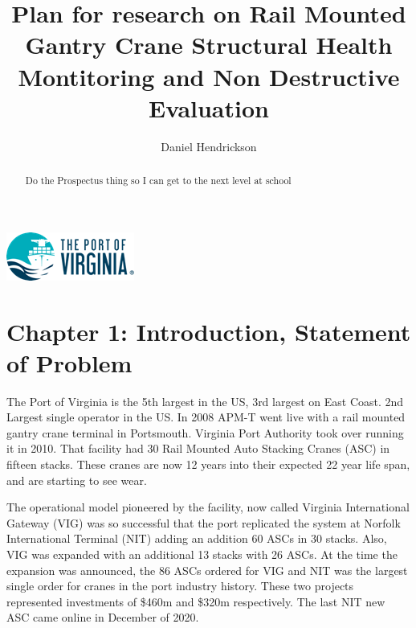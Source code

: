 \documentclass[journal=jacsat,manuscript=article]{achemso}
\author{Daniel Hendrickson}
\affiliation[Port of Virginia]
{Vice President Asset Management, Virginia Port Authority, Norfolk, VA}
\title[Research Prospecutus]
  {Plan for research on Rail Mounted Gantry Crane Structural Health Montitoring and Non Destructive Evaluation}
\begin{document}
\begin{tocentry}

\includegraphics{Figures/PortLogo}

\end{tocentry}

\begin{abstract}
 
Do the Prospectus thing so I can get to the next level at school
  

\end{abstract}
\pagebreak



\pagebreak
\section{Chapter 1: Introduction, Statement of Problem}
The Port of Virginia is the 5th largest in the US, 3rd largest on East Coast. 2nd Largest single operator in the US. In 2008 APM-T went live with a rail mounted gantry crane terminal in Portsmouth. Virginia Port Authority took over running it in 2010. That facility had 30 Rail Mounted Auto Stacking Cranes (ASC) in fifteen stacks. These cranes are now 12 years into their expected 22 year life span, and are starting to see wear. 

The operational model pioneered by the facility, now called Virginia International Gateway (VIG) was so successful that the port replicated the system at Norfolk International Terminal (NIT) adding an addition 60 ASCs in 30 stacks. Also, VIG was expanded with an additional 13 stacks with 26 ASCs. At the time the expansion was announced, the 86 ASCs ordered for VIG and NIT was the largest single order for cranes in the port industry history. These two projects represented investments of \$460m and \$320m respectively.  The last NIT new ASC came online in December of 2020. 
\end{document}
